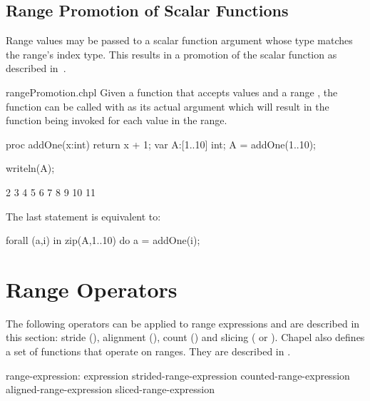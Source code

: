 \subsection{Range Promotion of Scalar Functions}
\label{Range_Promotion_of_Scalar_Functions}

Range values may be passed to a scalar function argument whose type
matches the range's index type.  This results in a promotion of the
scalar function as described in~.

\begin{chapelexample}{rangePromotion.chpl}
Given a function  that accepts  values and
a range , the function  can be called with
 as its actual argument which will result in the function
being invoked for each value in the range.

\begin{chapel}
proc addOne(x:int) {
  return x + 1;
}
var A:[1..10] int;
A = addOne(1..10);
\end{chapel}
\begin{chapelpost}
writeln(A);
\end{chapelpost}
\begin{chapeloutput}
2 3 4 5 6 7 8 9 10 11
\end{chapeloutput}

\end{chapelexample}

The last statement is equivalent to:
\begin{chapel}
forall (a,i) in zip(A,1..10) do
  a = addOne(i);
\end{chapel}





\section{Range Operators}
\label{Range_Operators}

The following operators can be applied to range
expressions and are described in this section: stride (),
alignment (), count (\chpl{\#}) and slicing (\chpl{\(\)}
or \chpl{\[\]}).
Chapel also defines a set of functions that operate on ranges.
They are described in .

\begin{syntax}
range-expression:
  expression
  strided-range-expression
  counted-range-expression
  aligned-range-expression
  sliced-range-expression
\end{syntax}

